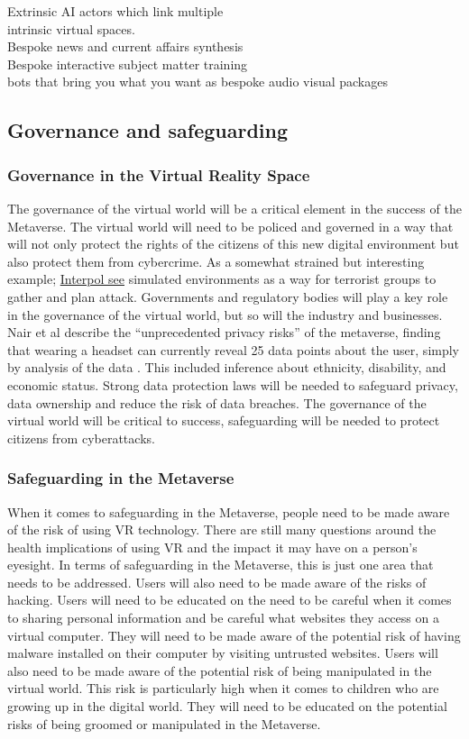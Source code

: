 Extrinsic AI actors which link multiple\\ intrinsic virtual spaces.\\
Bespoke news and current affairs synthesis\\
Bespoke interactive subject matter training\\
bots that bring you what you want as bespoke audio visual packages
\subsection{Governance and safeguarding}
\subsubsection{Governance in the Virtual Reality Space}
The governance of the virtual world will be a critical element in the success of the Metaverse. The virtual world will need to be policed and governed in a way that will not only protect the rights of the citizens of this new digital environment but also protect them from cybercrime. As a somewhat strained but interesting example; \href{https://www.reuters.com/technology/interpol-says-metaverse-opens-up-new-world-cybercrime-2022-10-27/}{Interpol see} simulated environments as a way for terrorist groups to gather and plan attack. Governments and regulatory bodies will play a key role in the governance of the virtual world, but so will the industry and businesses. Nair et al describe the ``unprecedented privacy risks'' of the metaverse, finding that wearing a headset can currently reveal 25 data points about the user, simply by analysis of the data \cite{nair2022exploring, Nair2023}.  This included inference about ethnicity, disability, and economic status. Strong data protection laws will be needed to safeguard privacy, data ownership and reduce the risk of data breaches. The governance of the virtual world will be critical to success, safeguarding will be needed to protect citizens from cyberattacks.
\subsubsection{Safeguarding in the Metaverse}
When it comes to safeguarding in the Metaverse, people need to be made aware of the risk of using VR technology. There are still many questions around the health implications of using VR and the impact it may have on a person’s eyesight. In terms of safeguarding in the Metaverse, this is just one area that needs to be addressed. Users will also need to be made aware of the risks of hacking. Users will need to be educated on the need to be careful when it comes to sharing personal information and be careful what websites they access on a virtual computer. They will need to be made aware of the potential risk of having malware installed on their computer by visiting untrusted websites. Users will also need to be made aware of the potential risk of being manipulated in the virtual world. This risk is particularly high when it comes to children who are growing up in the digital world. They will need to be educated on the potential risks of being groomed or manipulated in the Metaverse.\\

